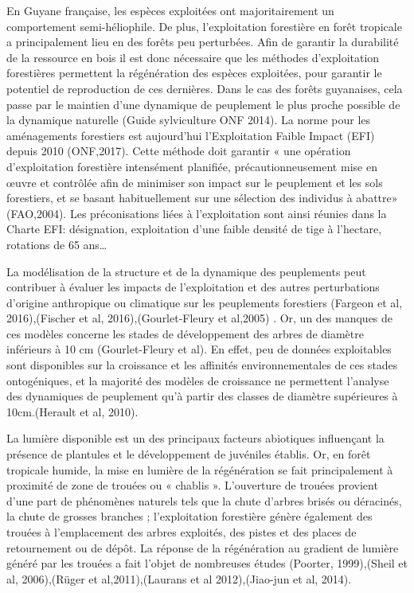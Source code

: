 \documentclass[
  12pt,
  american,
  a4paper,
  extrafontsizes,onecolumn,openright
  ]{memoir}
\begin{document}
En Guyane française, les espèces exploitées ont majoritairement un comportement semi-héliophile. De plus, l'exploitation forestière en forêt tropicale a principalement lieu en des forêts peu perturbées. Afin de garantir la durabilité de la ressource en bois il est donc nécessaire que les méthodes d'exploitation forestières permettent la régénération des espèces exploitées, pour garantir le potentiel de reproduction de ces dernières. Dans le cas des forêts guyanaises, cela passe par le maintien d'une dynamique de peuplement le plus proche possible de la dynamique naturelle (Guide sylviculture ONF 2014). La norme pour les aménagements forestiers est aujourd'hui l'Exploitation Faible Impact (EFI) depuis 2010 (ONF,2017). Cette méthode doit garantir « une opération d'exploitation forestière intensément planifiée, précautionneusement mise en œuvre et contrôlée afin de minimiser son impact sur le peuplement et les sols forestiers, et se basant habituellement sur une sélection des individus à abattre» (FAO,2004). Les préconisations liées à l'exploitation sont ainsi réunies dans la Charte EFI: désignation, exploitation d'une faible densité de tige à l'hectare, rotations de 65 ans\ldots{}

La modélisation de la structure et de la dynamique des peuplements peut contribuer à évaluer les impacts de l'exploitation et des autres perturbations d'origine anthropique ou climatique sur les peuplements forestiers (Fargeon et al, 2016),(Fischer et al, 2016),(Gourlet-Fleury et al,2005) . Or, un des manques de ces modèles concerne les stades de développement des arbres de diamètre inférieurs à 10 cm (Gourlet-Fleury et al). En effet, peu de données exploitables sont disponibles sur la croissance et les affinités environnementales de ces stades ontogéniques, et la majorité des modèles de croissance ne permettent l'analyse des dynamiques de peuplement qu'à partir des classes de diamètre supérieures à 10cm.(Herault et al, 2010).

La lumière disponible est un des principaux facteurs abiotiques influençant la présence de plantules et le développement de juvéniles établis. Or, en forêt tropicale humide, la mise en lumière de la régénération se fait principalement à proximité de zone de trouées ou « chablis ». L'ouverture de trouées provient d'une part de phénomènes naturels tels que la chute d'arbres brisés ou déracinés, la chute de grosses branches ; l'exploitation forestière génère également des trouées à l'emplacement des arbres exploités, des pistes et des places de retournement ou de dépôt. La réponse de la régénération au gradient de lumière généré par les trouées a fait l'objet de nombreuses études (Poorter, 1999),(Sheil et al, 2006),(Rüger et al,2011),(Laurans et al 2012),(Jiao-jun et al, 2014).
\end{document}
